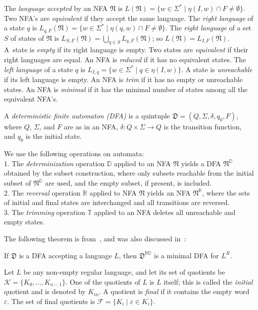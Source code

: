 \documentclass{llncs}
\newcommand{\eps}{\varepsilon}
\newcommand{\emp}{\emptyset}
\newcommand{\Sig}{\Sigma}
\newcommand{\cF}{{\mathcal F}}
\newcommand{\cK}{{\mathcal K}}
\newcommand{\fD}{{\mathfrak D}}
\newcommand{\fN}{{\mathfrak N}}
\newcommand{\rev}{\mathbb{R}}
\newcommand{\deter}{\mathbb{D}}
\newcommand{\trim}{\mathbb{T}}
\begin{document}
The \emph{language accepted} by an NFA $\fN$ is 
$L(\fN)=\{w\in\Sig^*\mid \eta(I,w)\cap F\neq \emp\}$.
Two NFA's are \emph{equivalent} if they accept the same language. 
The \emph{right language} of a state $q$  is
$L_{q,F}(\fN)=\{w\in\Sig^* \mid \eta(q,w)\cap F\neq\emp\}$.
The \emph{right language} of a set $S$ of states of $\fN$ is
$L_{S,F}(\fN)=\bigcup_{q\in S} L_{q,F}(\fN)$; so
$L(\fN)=L_{I,F}(\fN)$.
A~state is \emph{empty} if its right language is empty.
Two states   are \emph{equivalent} if their right 
languages are equal. 
An NFA is \emph{reduced} if it has no equivalent states.
The \emph{left language} of a state $q$  is
$L_{I,q}=\{w\in\Sig^* \mid q\in \eta(I,w)\}$.
A state is \emph{unreachable} if its left language is empty.
An NFA is \emph{trim} if it has no empty or unreachable states.
An NFA is \emph{minimal} if it has the minimal number of states among all
the equivalent NFA's.

A \emph{deterministic finite automaton (DFA)} is a quintuple 
$\fD=(Q, \Sig, \delta, q_0,F)$, where
$Q$, $\Sig$, and $F$ are as in an NFA, 
$\delta:Q\times \Sig\to Q$ is the transition function, 
and $q_0$ is the initial state. 

We use the following operations on automata: \\
 1.
The \emph{determinization} operation $\deter$ 
applied to an NFA $\fN$ yields a DFA $\fN^{\deter}$ obtained by 
the subset construction, where only subsets reachable 
from the initial subset of $\fN^\deter$ are used, and the empty subset, 
if present, is included. \\
 2.
The \emph{reversal} operation $\rev$ applied to NFA $\fN$ yields 
an NFA $\fN^{\rev}$, where the sets of initial and final states are 
interchanged and all transitions are reversed. \\
 3.
The \emph{trimming} operation $\trim$ applied to an NFA deletes all unreachable and empty states.
\smallskip



The following theorem is from~\cite{Brz63}, and was also discussed in~\cite{BrTa11}: 

\begin{theorem}[Determinization]
\label{thm:Brz}
If $\fD$ is a DFA accepting a language $L$, then $\fD^{\rev\deter}$ is 
a minimal DFA for $L^R$.
\end{theorem}

Let $L$ be any non-empty regular language, and let
its set of quotients be $\cK=\{K_0,\ldots, K_{n-1}\}$. 
One of the quotients of $L$ is $L$ itself;
this is called the \emph{initial} quotient and is denoted by $K_{in}$.
A quotient is  \emph{final} if it contains the empty word $\eps$.
The set of final quotients is  $\cF=\{K_i \mid \eps \in K_i\}$.
\end{document}

